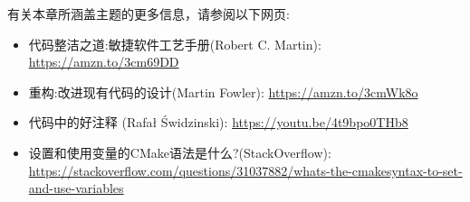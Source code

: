 
有关本章所涵盖主题的更多信息，请参阅以下网页:


\begin{itemize}
\item 
代码整洁之道:敏捷软件工艺手册(Robert C. Martin): \url{https://amzn.to/3cm69DD}

\item 
重构:改进现有代码的设计(Martin Fowler): \url{https://amzn.to/3cmWk8o}

\item 
代码中的好注释 (Rafał Świdzinski): \url{https://youtu.be/4t9bpo0THb8}

\item 
设置和使用变量的CMake语法是什么?(StackOverflow): \url{https://stackoverflow.com/questions/31037882/whats-the-cmakesyntax-to-set-and-use-variables}
\end{itemize}